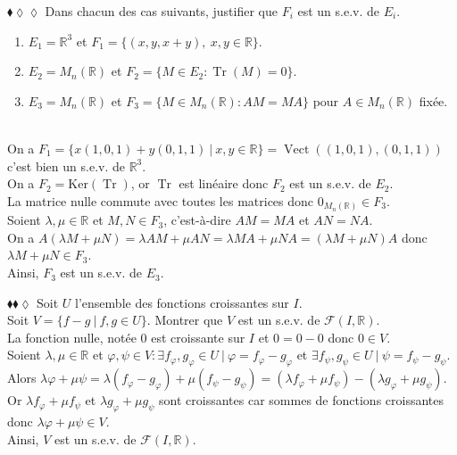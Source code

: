 \documentclass[11pt]{article}
\newcommand*{\F}{\mathcal{F}}
\newcommand*{\R}{\mathbb{R}}
\renewcommand*{\phi}{\varphi}
\renewcommand*{\ker}{\textrm{Ker}}
\DeclareMathOperator*{\vect}{Vect}
\DeclareMathOperator*{\tr}{Tr}
\begin{document}
\begin{exercise}{$\blacklozenge\lozenge\lozenge$}{}
    Dans chacun des cas suivants, justifier que $F_i$ est un s.e.v. de $E_i$.
    \begin{enumerate}[topsep=0pt,itemsep=-0.9ex]
        \item $E_1 = \R^3$ et $F_1 = \{(x, y, x + y), ~ x,y \in \R\}$. 
        \item $E_2 = M_n(\R)$ et $F_2 = \{M \in E_2 : \tr(M) = 0\}$.
        \item $E_3 = M_n(\R)$ et $F_3 = \{M \in M_n(\R) : AM = MA\}$ pour $A \in M_n(\R)$ fixée.
    \end{enumerate}
    \tcblower\\[0.2cm]
     On a $F_1 = \{x(1, 0, 1) + y(0, 1, 1) ~ | ~ x,y \in \R\} = \vect((1, 0, 1), (0, 1, 1))$ c'est bien un s.e.v. de $\R^3$.\\[0.2cm]
     On a $F_2 = \ker(\tr)$, or $\tr$ est linéaire donc $F_2$ est un s.e.v. de $E_2$.\\[0.2cm]
     La matrice nulle commute avec toutes les matrices donc $0_{M_n(\R)} \in F_3$.\\
    Soient $\lambda, \mu \in \R$ et $M, N \in F_3$, c'est-à-dire $AM = MA$ et $AN = NA$.\\
    On a $A(\lambda M + \mu N) = \lambda AM + \mu AN = \lambda MA + \mu NA = (\lambda M + \mu N)A$ donc $\lambda M + \mu N \in F_3$.\\
    Ainsi, $F_3$ est un s.e.v. de $E_3$.
\end{exercise}

\begin{exercise}{$\blacklozenge\blacklozenge\lozenge$}{}
    Soit $U$ l'ensemble des fonctions croissantes sur $I$.\\
    Soit $V = \{f - g ~ | ~ f,g \in U\}$. Montrer que $V$ est un s.e.v. de $\F(I, \R)$.
    \tcblower\\[0.2cm]
    La fonction nulle, notée $0$ est croissante sur $I$ et $0 = 0 - 0$ donc $0 \in V$.\\ 
    Soient $\lambda,\mu\in\R$ et $\phi, \psi \in V : \exists f_\phi,g_\phi \in U ~ | ~ \phi = f_\phi - g_\phi$ et $\exists f_\psi,g_\psi \in U ~ | ~ \psi = f_\psi - g_\psi$.\\
    Alors $\lambda\phi + \mu\psi = \lambda(f_\phi - g_\phi) + \mu(f_\psi - g_\psi) = (\lambda f_\phi + \mu f_\psi) - (\lambda g_\phi + \mu g_\psi)$.\\
    Or $\lambda f_\phi + \mu f_\psi$ et $\lambda g_\phi + \mu g_\psi$ sont croissantes car sommes de fonctions croissantes donc $\lambda\phi + \mu\psi \in V$.\\
    Ainsi, $V$ est un s.e.v. de $\F(I, \R)$.
\end{exercise}
\end{document}
